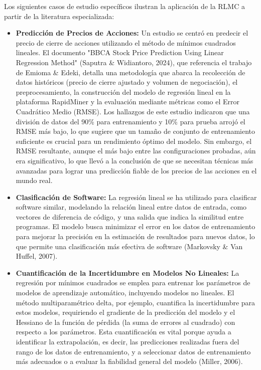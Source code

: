 \documentclass[]{article}
\begin{document}
	Los siguientes casos de estudio específicos ilustran la aplicación de la RLMC a partir de la literatura especializada:
	\\
	\begin{itemize}
		\item \textbf{Predicción de Precios de Acciones:} Un estudio se centró en predecir el precio de cierre de acciones utilizando el método de mínimos cuadrados lineales. El documento "BBCA Stock Price Prediction Using Linear Regression Method" (Saputra \& Widiantoro, 2024), que referencia el trabajo de Emioma \& Edeki, detalla una metodología que abarca la recolección de datos históricos (precio de cierre ajustado y volumen de negociación), el preprocesamiento, la construcción del modelo de regresión lineal en la plataforma RapidMiner y la evaluación mediante métricas como el Error Cuadrático Medio (RMSE). Los hallazgos de este estudio indicaron que una división de datos del 90\% para entrenamiento y 10\% para prueba arrojó el RMSE más bajo, lo que sugiere que un tamaño de conjunto de entrenamiento suficiente es crucial para un rendimiento óptimo del modelo. Sin embargo, el RMSE resultante, aunque el más bajo entre las configuraciones probadas, aún era significativo, lo que llevó a la conclusión de que se necesitan técnicas más avanzadas para lograr una predicción fiable de los precios de las acciones en el mundo real.
		\item \textbf{Clasificación de Software:} La regresión lineal se ha utilizado para clasificar software similar, modelando la relación lineal entre datos de entrada, como vectores de diferencia de código, y una salida que indica la similitud entre programas. El modelo busca minimizar el error en los datos de entrenamiento para mejorar la precisión en la estimación de resultados para nuevos datos, lo que permite una clasificación más efectiva de software (Markovsky \& Van Huffel, 2007).
		\item \textbf{Cuantificación de la Incertidumbre en Modelos No Lineales:} La regresión por mínimos cuadrados se emplea para entrenar los parámetros de modelos de aprendizaje automático, incluyendo modelos no lineales. El método multiparamétrico delta, por ejemplo, cuantifica la incertidumbre para estos modelos, requiriendo el gradiente de la predicción del modelo y el Hessiano de la función de pérdida (la suma de errores al cuadrado) con respecto a los parámetros. Esta cuantificación es vital porque ayuda a identificar la extrapolación, es decir, las predicciones realizadas fuera del rango de los datos de entrenamiento, y a seleccionar datos de entrenamiento más adecuados o a evaluar la fiabilidad general del modelo (Miller, 2006).
	\end{itemize}
	
\end{document}
